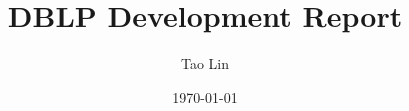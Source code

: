 \documentclass[11pt]{article}
\theoremstyle{plain}
\theoremstyle{definition}
\begin{document}
\title{DBLP Development Report}
\date{\today}
\author{Tao Lin}
\maketitle

\section{}





\end{document}
